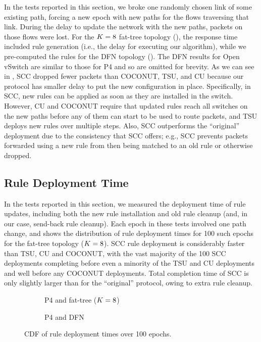 In the tests reported in this section, we broke one randomly chosen
link of some existing path, forcing a new epoch with new paths for
the flows traversing that link.  During the delay to update the network with the new
paths, packets on those flows were lost.  For the $K=8$
fat-tree topology
(),
the response time included rule generation (i.e., the delay for
executing our algorithm), while we pre-computed the rules for the DFN
topology ().  The DFN results for Open
vSwitch are similar to those for P4 and so are omitted for brevity.
As we can see in , SCC dropped fewer packets
than COCONUT, TSU, and CU because our protocol has smaller delay to
put the new configuration in place. Specifically, in SCC, new rules
can be applied as soon as they are installed in the switch.  However,
CU and COCONUT require that updated rules reach all switches on the
new paths before any of them can start to be used to route packets, and
TSU deploys new rules over multiple steps. Also, SCC outperforms the
``original'' deployment due to the consistency that SCC offers; e.g.,
SCC prevents packets forwarded using a new rule from then being
matched to an old rule or otherwise dropped.

\subsection{Rule Deployment Time}
\label{sec:eval:deployment}

In the tests reported in this section, we measured the deployment time
of rule updates, including both the new rule installation and old rule
cleanup (and, in our case, send-back rule cleanup).  Each epoch in
these tests involved one path change, and 
shows the distribution of rule deployment times for 100 such epochs
for the fat-tree topology ($K=8$).  SCC rule deployment
is considerably faster than TSU, CU and COCONUT, with the vast
majority of the 100 SCC deployments completing before even a minority
of the TSU and CU deployments and well before any COCONUT deployments.
Total completion time of SCC is only slightly larger than for the
``original'' protocol, owing to extra rule cleanup.

\begin{figure}[h]
\centering
  \begin{subfigure}[b]{0.49\linewidth}
    \resizebox{\linewidth}{!}{}
    \caption{P4 and fat-tree ($K=8$)}
    \label{fig:completion_time:p4}
  \end{subfigure}
    \begin{subfigure}[b]{0.49\linewidth}
    \resizebox{\linewidth}{!}{}
    \caption{P4 and DFN}
    \label{fig:completion_time:openvswitch}
  \end{subfigure}
\caption{CDF of rule deployment times over 100 epochs.}
\label{fig:completion_time}
\end{figure}

